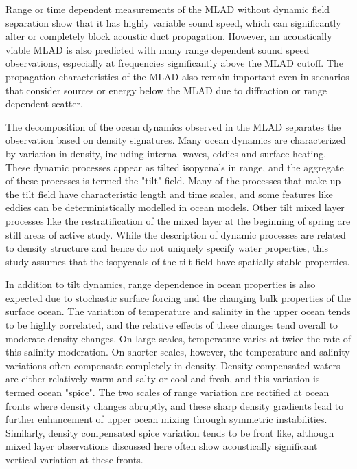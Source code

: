 \documentclass[preprint,NumberedRefs]{JASA}
\begin{document}
Range or time dependent measurements of the MLAD without dynamic field separation show that it has highly variable sound speed\citep{cole2010seasonal,rudnick1999compensation,klymak2015}, which can significantly alter or completely block acoustic duct propagation\citep{colosi2020observations,colosi21}. However, an acoustically viable MLAD is also predicted with many range dependent sound speed observations, especially at frequencies significantly above the MLAD cutoff. The propagation characteristics of the MLAD also remain important even in scenarios that consider sources or energy below the MLAD due to diffraction or range dependent scatter\citep{colosi21}.

The decomposition of the ocean dynamics observed in the MLAD separates the observation based on density signatures. Many ocean dynamics are characterized by variation in density, including internal waves, eddies and surface heating. These dynamic processes appear as tilted isopycnals in range, and the aggregate of these processes is termed the "tilt" field\cite{dzieciuch2004}. Many of the processes that make up the tilt field have characteristic length and time scales, and some features like eddies can be deterministically modelled in ocean models. Other tilt mixed layer processes like the restratification of the mixed layer at the beginning of spring are still areas of active study\cite{cole2010seasonal}. While the description of dynamic processes are related to density structure and hence do not uniquely specify water properties, this study assumes that the isopycnals of the tilt field have spatially stable properties.

In addition to tilt dynamics, range dependence in ocean properties is also expected due to stochastic surface forcing and the changing bulk properties of the surface ocean\citep{ferrari2000}. The variation of temperature and salinity in the upper ocean tends to be highly correlated, and the relative effects of these changes tend overall to moderate density changes. On large scales, temperature varies at twice the rate of this salinity moderation. On shorter scales, however, the temperature and salinity variations often compensate completely in density. Density compensated waters are either relatively warm and salty or cool and fresh, and this variation is termed ocean "spice"\citep{munk1981evolution}. The two scales of range variation are rectified at ocean fronts where density changes abruptly, and these sharp density gradients lead to further enhancement of upper ocean mixing through symmetric instabilities\citep{dasaro2011}. Similarly, density compensated spice variation tends to be front like, although mixed layer observations discussed here often show acoustically significant vertical variation at these fronts.
\end{document}

